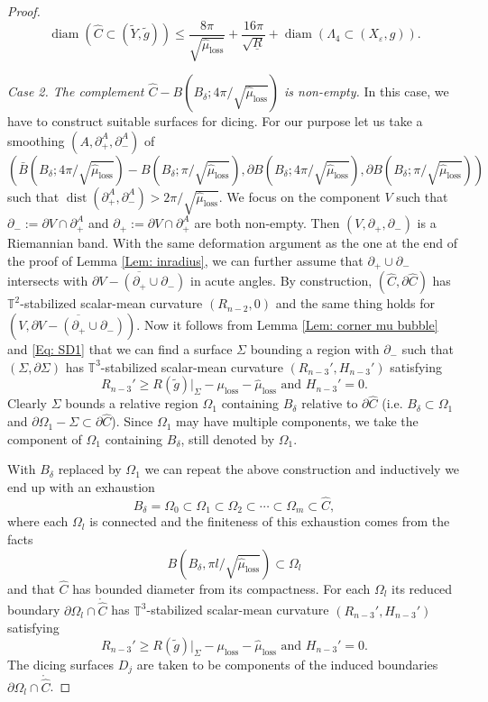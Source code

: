 \documentclass[11pt,letterpaper]{amsart}
\numberwithin{equation}{section}
\theoremstyle{definition}
\DeclareMathOperator{\dist}{dist}
\DeclareMathOperator{\diam}{diam}
\newcommand{\ve}{\varepsilon}
\begin{document}
\begin{proof}
$$\diam(\hat C\subset (\tilde Y,\tilde g))\leq \frac{8\pi}{\sqrt {\hat \mu_{\mathrm{loss}}}}+\frac{16\pi}{\sqrt{\underline R}}+\diam(\Lambda_4\subset(X_\ve,g)).$$


\medskip
{\it Case 2. The complement $\hat C-B( B_\delta;4\pi/\sqrt{\hat \mu_{\mathrm{loss}}})$ is non-empty.} In this case, we have to construct suitable surfaces for dicing. For our purpose let us {take a smoothing $(A,\partial_{+}^{A},\partial_{-}^{A})$ of}
$$\left(\bar B(B_\delta;4\pi/\sqrt{\hat \mu_{\mathrm{loss}}})-B(B_\delta;\pi/\sqrt{\hat \mu_{\mathrm{loss}}}),
 \partial B(B_\delta;4\pi/\sqrt{\hat \mu_{\mathrm{loss}}}),
\partial B(B_\delta;\pi/\sqrt{\hat \mu_{\mathrm{loss}}})\right)
$$
such that $\dist(\partial_+^{A},\partial_-^{A})>2\pi/\sqrt{\hat \mu_{\mathrm{loss}}}.$ {We focus on the component $V$ such that $\partial_-:=\partial V\cap\partial_+^{A}$ and $\partial_+:=\partial V\cap\partial_+^{A}$ are both non-empty. Then $(V,\partial_{+},\partial_{-})$ is a Riemannian band.} With the same deformation argument as the one at the end of the proof of Lemma \ref{Lem: inradius}, we can further assume that $\partial_+\cup\partial_-$ intersects with $\overline{\partial V-(\partial_+\cup\partial_-)}$ in acute angles. By construction, $(\hat C,\partial\hat C)$ has $\mathbb T^2$-stabilized scalar-mean curvature $(R_{n-2},0)$ and the same thing holds for $(V,\overline{\partial V-(\partial_+\cup\partial_-)})$. Now it follows from Lemma \ref{Lem: corner mu bubble} and \eqref{Eq: SD1} that we can find a surface $\Sigma$ bounding a region with $\partial_-$ such that $(\Sigma,\partial\Sigma)$ has $\mathbb T^3$-stabilized scalar-mean curvature $(R_{n-3}',H_{n-3}')$ satisfying
$$
R_{n-3}'\geq R(\tilde g)|_{\Sigma}-\mu_{\mathrm{loss}}-\hat \mu_{\mathrm{loss}}\mbox{ and }H_{n-3}'=0.
$$
Clearly $\Sigma$ bounds a relative region $\Omega_1$ containing $B_\delta$ relative to $\partial \hat C$ (i.e. $B_{\delta}\subset\Omega_{1}$ and $\partial\Omega_{1}-\Sigma\subset\partial\hat{C}$). Since $\Omega_1$ may have multiple components, we take the component of $\Omega_1$ containing $B_\delta$, still denoted by $\Omega_1$.

With $B_\delta$ replaced by $\Omega_1$ we can repeat the above construction and inductively we end up with an exhaustion
$$
B_\delta=\Omega_0\subset\Omega_1\subset \Omega_2\subset \cdots \subset\Omega_m\subset\hat C,
$$
where each $\Omega_{l}$ is connected and the finiteness of this exhaustion comes from the facts
$$B(B_\delta,\pi {l}/\sqrt{\hat \mu_{\mathrm{loss}}})\subset \Omega_{l}$$ and that $\hat C$ has bounded diameter from its compactness. For each $\Omega_{l}$ its reduced boundary $\partial\Omega_{l}\cap \mathring {\hat C}$ has $\mathbb T^3$-stabilized scalar-mean curvature $(R_{n-3}',H_{n-3}')$ satisfying
$$
R_{n-3}'\geq R(\tilde g)|_{\Sigma}-\mu_{\mathrm{loss}}-\hat \mu_{\mathrm{loss}}\mbox{ and }H_{n-3}'=0.
$$
The dicing surfaces $D_j$ are taken to be components of the induced boundaries $\partial\Omega_{l} \cap \mathring {\hat C}$.


\end{proof}
\end{document}
